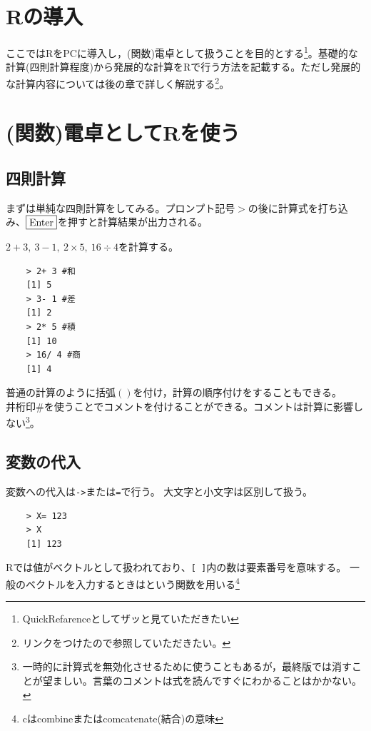 \section{Rの導入}
    ここではRをPCに導入し，(関数)電卓として扱うことを目的とする\footnote{QuickRefarenceとしてザッと見ていただきたい}。基礎的な計算(四則計算程度)から発展的な計算をRで行う方法を記載する。ただし発展的な計算内容については後の章で詳しく解説する\footnote{リンクをつけたので参照していただきたい。}。

\section{(関数)電卓としてRを使う}
\subsection{四則計算}
    まずは単純な四則計算をしてみる。プロンプト記号$\mathtt{>}$の後に計算式を打ち込み、$\fbox{Enter}$を押すと計算結果が出力される。
\begin{example}
    $2+ 3,\ 3- 1,\ 2\times 5,\ 16\div 4$を計算する。
\begin{tcolorbox}
\begin{verbatim}
    > 2+ 3 #和
    [1] 5
    > 3- 1 #差
    [1] 2
    > 2* 5 #積
    [1] 10
    > 16/ 4 #商
    [1] 4
\end{verbatim}
\end{tcolorbox}
\end{example}
    普通の計算のように括弧$()$を付け，計算の順序付けをすることもできる。\\
    井桁印$\#$を使うことでコメントを付けることができる。コメントは計算に影響しない\footnote{一時的に計算式を無効化させるために使うこともあるが，最終版では消すことが望ましい。言葉のコメントは式を読んですぐにわかることはかかない。}。


    \subsection{変数の代入}
    変数への代入は\texttt{->}または\texttt{=}で行う。
    大文字と小文字は区別して扱う。
\begin{verbatim}
    > X= 123
    > X
    [1] 123
\end{verbatim}

    Rでは値がベクトルとして扱われており、\texttt{[\ ]}内の数は要素番号を意味する。
    一般のベクトルを入力するときはという関数を用いる\footnote{cはcombineまたはcomcatenate(結合)の意味}

